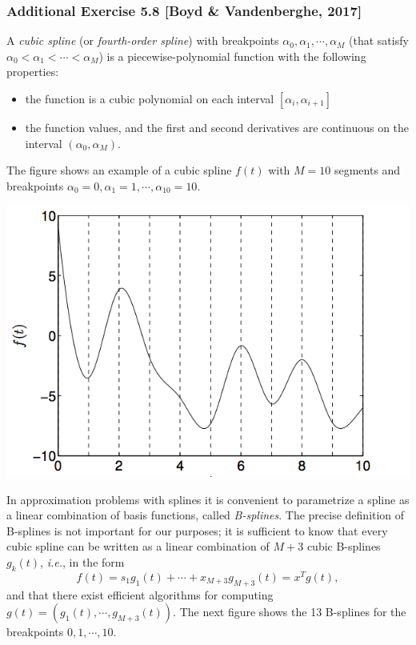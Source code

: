 \documentclass[12pt,a4paper]{article}
\newcommand\ie{{\it i.e.}}
\begin{document}
\newpage\subsubsection*{Additional Exercise 5.8 [Boyd \& Vandenberghe, 2017]}
 A {\it cubic spline} (or {\it fourth-order spline}) with breakpoints $\alpha_0, \alpha_1, \cdots, \alpha_M$ (that satisfy $\alpha_0 < \alpha_1 < \cdots < \alpha_M$) is a piecewise-polynomial function with the following properties: \begin{itemize}
\item the function is a cubic polynomial on each interval $[\alpha_i, \alpha_{i+1}]$
\item the function values, and the first and second derivatives are continuous on the interval $(\alpha_0, \alpha_M)$.
\end{itemize}
The figure shows an example of a cubic spline $f(t)$ with $M=10$ segments and breakpoints $\alpha_0=0, \alpha_1 = 1, \cdots, \alpha_{10} = 10$.
\begin{center}
\includegraphics[scale=0.5]{hw2_p58.png}
\end{center}
In approximation problems with splines it is convenient to parametrize a spline as a linear combination of basis functions, called {\it B-splines}. The precise definition of B-splines is not important for our purposes; it is sufficient to know that every cubic spline can be written as a linear combination of $M+3$ cubic B-splines $g_k(t)$, \ie, in the form
$$f(t) = s_1g_1(t) + \cdots + x_{M+3}g_{M+3}(t) = x^T g(t),$$
and that there exist efficient algorithms for computing $g(t) = (g_1(t), \cdots, g_{M+3}(t))$. The next figure shows the 13 B-splines for the breakpoints $0, 1, \cdots, 10$. 
\end{document}
